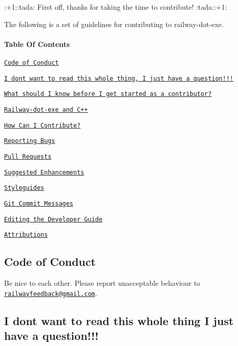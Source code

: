 \+:+1\+::tada\+: First off, thanks for taking the time to contribute! \+:tada\+:\+:+1\+:

The following is a set of guidelines for contributing to railway-\/dot-\/exe.

\paragraph*{Table Of Contents}

\href{#code-of-conduct}{\tt Code of Conduct}

\href{#i-dont-want-to-read-this-whole-thing-i-just-have-a-question}{\tt I don\textquotesingle{}t want to read this whole thing, I just have a question!!!}

\href{#what-should-i-know-before-i-get-started-as-a-contributor}{\tt What should I know before I get started as a contributor?}
\begin{DoxyItemize}
\item \href{#railway-dot-exe-and-c++}{\tt Railway-\/dot-\/exe and C++}
\end{DoxyItemize}

\href{#how-can-i-contribute}{\tt How Can I Contribute?}
\begin{DoxyItemize}
\item \href{#reporting-bugs}{\tt Reporting Bugs}
\item \href{#pull-requests}{\tt Pull Requests}
\item \href{#suggested-enhancements}{\tt Suggested Enhancements}
\end{DoxyItemize}

\href{#styleguides}{\tt Styleguides}
\begin{DoxyItemize}
\item \href{#git-commit-messages}{\tt Git Commit Messages}
\item \href{#editing-the-developer-guide}{\tt Editing the Developer Guide}
\end{DoxyItemize}

\href{#attributions}{\tt Attributions}

\subsection*{Code of Conduct}

Be nice to each other. Please report unacceptable behaviour to \href{mailto:railwayfeedback@gmail.com}{\tt railwayfeedback@gmail.\+com}.

\subsection*{I don\textquotesingle{}t want to read this whole thing I just have a question!!!}


